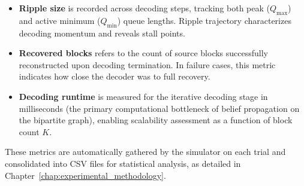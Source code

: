 \begin{itemize}
    \item \textbf{Ripple size} is recorded across decoding steps, tracking both peak ($Q_{\max}$) and active minimum ($Q_{\min}$) queue lengths. Ripple trajectory characterizes decoding momentum and reveals stall points.
    
    \item \textbf{Recovered blocks} refers to the count of source blocks successfully reconstructed upon decoding termination. In failure cases, this metric indicates how close the decoder was to full recovery.
    
    \item \textbf{Decoding runtime} is measured for the iterative decoding stage in milliseconds (the primary computational bottleneck of belief propagation on the bipartite graph), enabling scalability assessment as a function of block count $K$.
\end{itemize}

These metrics are automatically gathered by the simulator on each trial and consolidated into CSV files for statistical analysis, as detailed in Chapter~\ref{chap:experimental_methodology}.

